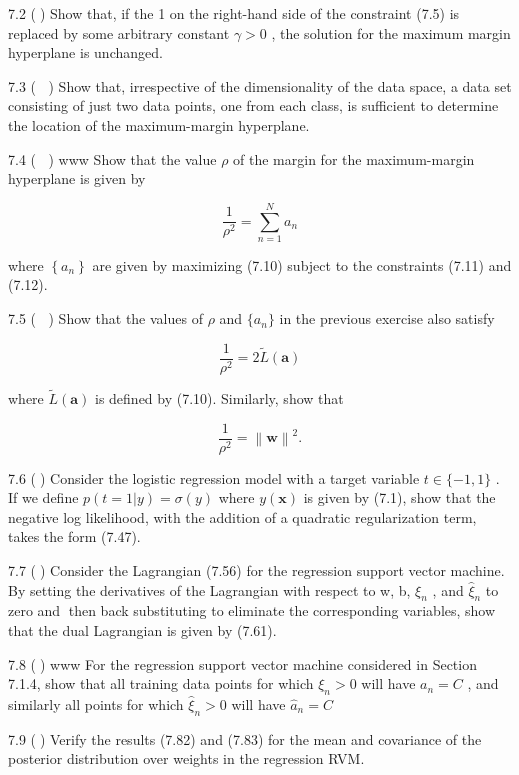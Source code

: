 \documentclass[
  10
]{article}
\begin{document}
7.2 () Show that, if the 1 on the right-hand side of the constraint
(7.5) is replaced by some arbitrary constant \(\gamma > 0\) , the
solution for the maximum margin hyperplane is unchanged.

7.3 ( ) Show that, irrespective of the dimensionality of the data space,
a data set consisting of just two data points, one from each class, is
sufficient to determine the location of the maximum-margin hyperplane.

7.4 ( ) www Show that the value \(\rho\) of the margin for the
maximum-margin hyperplane is given by

\[
{\frac {1}{\rho^ {2}}} = \sum_ {n = 1} ^ {N} a _ {n}\tag{7.123}
\]

where \(\left\{ a _ { n } \right\}\) are given by maximizing (7.10)
subject to the constraints (7.11) and (7.12).

7.5 ( ) Show that the values of \(\rho\) and \(\{ a _ { n } \}\) in the
previous exercise also satisfy

\[
\frac {1}{\rho^ {2}} = 2 \widetilde {L} (\mathbf {a})\tag{7.124}
\]

where \(\widetilde L ( \mathbf { a } )\) is defined by (7.10).
Similarly, show that

\[
\frac {1}{\rho^ {2}} = \left\| \mathbf {w} \right\| ^ {2}.\tag{7.125}
\]

7.6 () Consider the logistic regression model with a target variable
\(t \in \{ - 1 , 1 \}\) . If we define
\(p ( t = 1 | y ) = \sigma ( y )\) where \(y ( \mathbf x )\) is given by
(7.1), show that the negative log likelihood, with the addition of a
quadratic regularization term, takes the form (7.47).

7.7 () Consider the Lagrangian (7.56) for the regression support vector
machine. By setting the derivatives of the Lagrangian with respect to w,
b, \(\xi _ { n }\) , and \(\widehat { \xi } _ { n }\) to zero and then
back substituting to eliminate the corresponding variables, show that
the dual Lagrangian is given by (7.61).

7.8 () www For the regression support vector machine considered in
Section 7.1.4, show that all training data points for which
\(\xi _ { n } > 0\) will have \(a _ { n } = C\) , and similarly all
points for which \(\widehat { \xi } _ { n } > 0\) will have
\(\widehat { a } _ { n } = C\)

7.9 () Verify the results (7.82) and (7.83) for the mean and covariance
of the posterior distribution over weights in the regression RVM.
\end{document}
